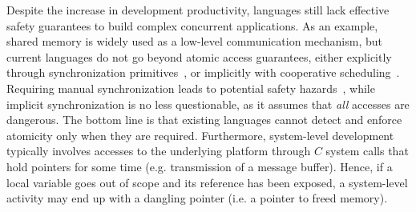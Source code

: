 \documentclass[10pt]{sensys-proc}
\begin{document}
Despite the increase in development productivity, languages still lack
effective safety guarantees to build complex concurrent applications.
%
As an example, shared memory is widely used as a low-level communication 
mechanism, but current languages do not go beyond atomic access guarantees, 
either explicitly through synchronization 
primitives~\cite{wsn.mantisos,wsn.tinythreads}, or implicitly with cooperative 
scheduling~\cite{wsn.sol,wsn.nesc}.
Requiring manual synchronization leads to potential safety 
hazards~\cite{sync_async.threadsproblems}, while implicit synchronization is no 
less questionable, as it assumes that \emph{all} accesses are dangerous.
The bottom line is that existing languages cannot detect and enforce atomicity 
only when they are required.
%
Furthermore, system-level development typically involves accesses to the 
underlying platform through $C$ system calls that hold pointers for some time
(e.g. transmission of a message buffer).
Hence, if a local variable goes out of scope and its reference has been 
exposed, a system-level activity may end up with a dangling pointer (i.e. a 
pointer to freed memory).
\end{document}
